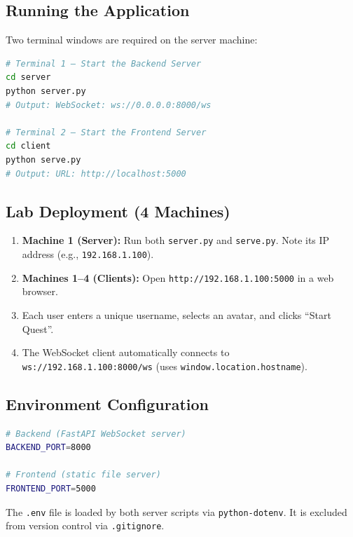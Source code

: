 \documentclass[12pt, a4paper]{article}
\begin{document}
\subsection{Running the Application}

Two terminal windows are required on the server machine:

\begin{lstlisting}[language=bash, caption={Starting the Servers}, label={lst:start}]
# Terminal 1 — Start the Backend Server
cd server
python server.py
# Output: WebSocket: ws://0.0.0.0:8000/ws

# Terminal 2 — Start the Frontend Server
cd client
python serve.py
# Output: URL: http://localhost:5000
\end{lstlisting}

\subsection{Lab Deployment (4 Machines)}

\begin{enumerate}[leftmargin=*]
    \item \textbf{Machine 1 (Server):} Run both \texttt{server.py} and \texttt{serve.py}. Note its IP address (e.g., \texttt{192.168.1.100}).
    \item \textbf{Machines 1–4 (Clients):} Open \texttt{http://192.168.1.100:5000} in a web browser.
    \item Each user enters a unique username, selects an avatar, and clicks ``Start Quest''.
    \item The WebSocket client automatically connects to \texttt{ws://192.168.1.100:8000/ws} (uses \texttt{window.location.hostname}).
\end{enumerate}

\subsection{Environment Configuration}

\begin{lstlisting}[language=bash, caption={.env Configuration File}, label={lst:env}]
# Backend (FastAPI WebSocket server)
BACKEND_PORT=8000

# Frontend (static file server)
FRONTEND_PORT=5000
\end{lstlisting}

The \texttt{.env} file is loaded by both server scripts via \texttt{python-dotenv}. It is excluded from version control via \texttt{.gitignore}.
\end{document}

